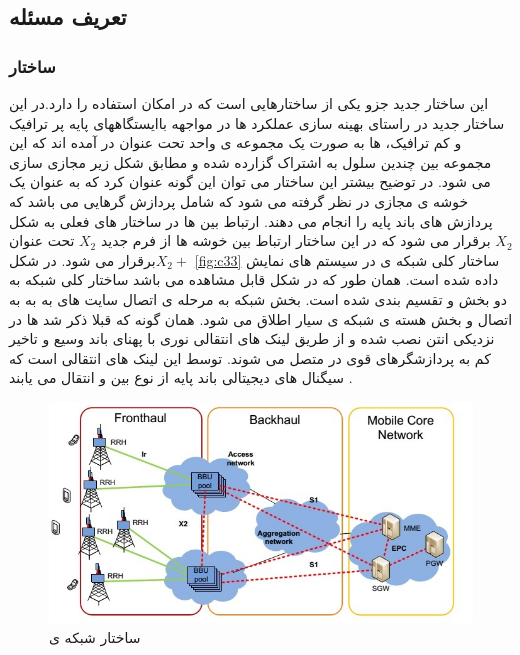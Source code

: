 \subsection{تعریف مسئله}
\subsubsection{ساختار }
این ساختار جدید جزو یکی از ساختارهایی است که در  امکان استفاده را دارد.در این ساختار جدید در راستای بهینه سازی عملکرد 
 ها در مواجهه باایستگاههای پایه پر ترافیک و کم ترافیک،
 ها به صورت یک مجموعه ی واحد تحت عنوان 
 در آمده اند که این مجموعه بین چندین سلول 
 به اشتراک گزارده شده و مطابق شکل زیر مجازی سازی
می شود. 
در توضیح بیشتر این ساختار می توان این گونه
عنوان کرد که  به عنوان یک خوشه ی مجازی
در نظر گرفته می شود که شامل پردازش گرهایی می باشد
که پردازش های باند پایه را انجام می دهند. ارتباط بین
  ها در ساختار های فعلی به شکل  $X_2$ برقرار می شود
که در این ساختار ارتباط بین خوشه ها از فرم جدید $X_2$
تحت عنوان  $X_2 +$برقرار می شود.
\newline
در شکل \ref{fig:c33} ساختار کلی شبکه ی   در سیستم های
 نمایش داده شده است. همان طور که در شکل قابل
مشاهده می باشد ساختار کلی شبکه   به دو بخش
  و  تقسیم بندی شده است. بخش
 شبکه به مرحله ی اتصال سایت های به
 به  به اتصال  و بخش 
هسته ی شبکه ی سیار اطلاق می شود. همان گونه که قبلا
ذکر شد  ها در نزدیکی انتن نصب شده و از طریق
لینک های انتقالی نوری با پهنای باند وسیع و تاخیر کم به
پردازشگرهای قوی در  متصل می شوند. توسط این
لینک های انتقالی است که سیگنال های دیجیتالی باند
پایه از نوع  بین  و  انتقال می یابند \cite{checko2015cloud}.
\begin{figure}
  \centering
    \includegraphics[width=\textwidth]{./pic1/CRAN}
  \caption{ساختار شبکه ی  \cite{checko2015cloud}}
  \label{fig:C-RAN}
\end{figure}
